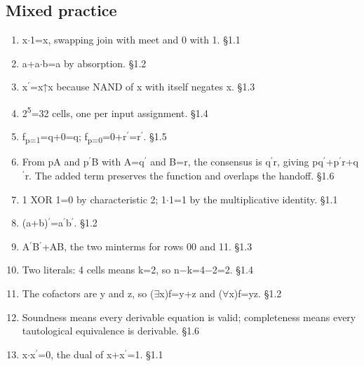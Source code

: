 \documentclass[11pt]{article}
\begin{document}
\begin{keepsection}\subsection{Mixed practice}

\begin{enumerate}
\item x\ensuremath{\cdot}1=x, swapping join with meet and 0 with 1. \hfill{\small\color{FAUblue}§1.1}
\item a+a\ensuremath{\cdot}b=a by absorption. \hfill{\small\color{FAUblue}§1.2}
\item x\ensuremath{{}^{\prime}}=x↑x because NAND of x with itself negates x. \hfill{\small\color{FAUblue}§1.3}
\item 2\textsuperscript{5}=32 cells, one per input assignment. \hfill{\small\color{FAUblue}§1.4}
\item f\textsubscript{p=1}=q+0=q; f\textsubscript{p=0}=0+r\ensuremath{{}^{\prime}}=r\ensuremath{{}^{\prime}}. \hfill{\small\color{FAUblue}§1.5}
\item From pA and p\ensuremath{{}^{\prime}}B with A=q\ensuremath{{}^{\prime}} and B=r, the consensus is q\ensuremath{{}^{\prime}}r, giving pq\ensuremath{{}^{\prime}}+p\ensuremath{{}^{\prime}}r+q\ensuremath{{}^{\prime}}r. The added term preserves the function and overlaps the handoff. \hfill{\small\color{FAUblue}§1.6}
\item 1 XOR 1=0 by characteristic 2; 1\ensuremath{\cdot}1=1 by the multiplicative identity. \hfill{\small\color{FAUblue}§1.1}
\item (a+b)\ensuremath{{}^{\prime}}=a\ensuremath{{}^{\prime}}b\ensuremath{{}^{\prime}}. \hfill{\small\color{FAUblue}§1.2}
\item A\ensuremath{{}^{\prime}}B\ensuremath{{}^{\prime}}+AB, the two minterms for rows 00 and 11. \hfill{\small\color{FAUblue}§1.3}
\item Two literals: 4 cells means k=2, so n\ensuremath{-}k=4\ensuremath{-}2=2. \hfill{\small\color{FAUblue}§1.4}
\item The cofactors are y and z, so (\ensuremath{\exists}x)f=y+z and (\ensuremath{\forall}x)f=yz. \hfill{\small\color{FAUblue}§1.2}
\item Soundness means every derivable equation is valid; completeness means every tautological equivalence is derivable. \hfill{\small\color{FAUblue}§1.6}
\item x\ensuremath{\cdot}x\ensuremath{{}^{\prime}}=0, the dual of x+x\ensuremath{{}^{\prime}}=1. \hfill{\small\color{FAUblue}§1.1}

\end{enumerate}
\end{keepsection}
\end{document}
